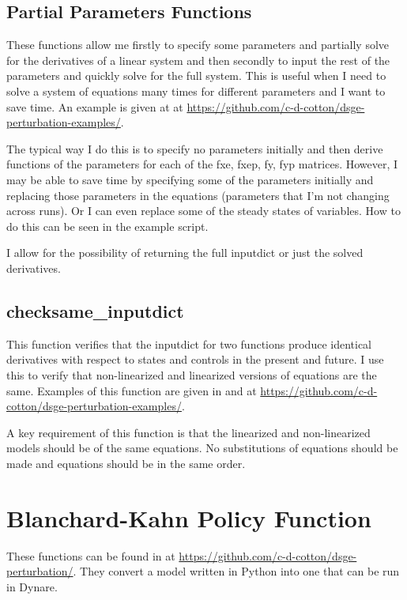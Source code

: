 \documentclass{article}
\theoremstyle{definition}
\begin{document}
\subsection{Partial Parameters Functions}
These functions allow me firstly to specify some parameters and partially solve for the derivatives of a linear system and then secondly to input the rest of the parameters and quickly solve for the full system. This is useful when I need to solve a system of equations many times for different parameters and I want to save time. An example is given at  at \url{https://github.com/c-d-cotton/dsge-perturbation-examples/}.

The typical way I do this is to specify no parameters initially and then derive functions of the parameters for each of the fxe, fxep, fy, fyp matrices. However, I may be able to save time by specifying some of the parameters initially and replacing those parameters in the equations (parameters that I'm not changing across runs). Or I can even replace some of the steady states of variables. How to do this can be seen in the example script.

I allow for the possibility of returning the full inputdict or just the solved derivatives.

\subsection{checksame\_inputdict}
This function verifies that the inputdict for two functions produce identical derivatives with respect to states and controls in the present and future. I use this to verify that non-linearized and linearized versions of equations are the same. Examples of this function are given in  and  at \url{https://github.com/c-d-cotton/dsge-perturbation-examples/}. 

A key requirement of this function is that the linearized and non-linearized models should be of the same equations. No substitutions of equations should be made and equations should be in the same order.





\section{Blanchard-Kahn Policy Function}
These functions can be found in  at \url{https://github.com/c-d-cotton/dsge-perturbation/}. They convert a model written in Python into one that can be run in Dynare.
\end{document}
